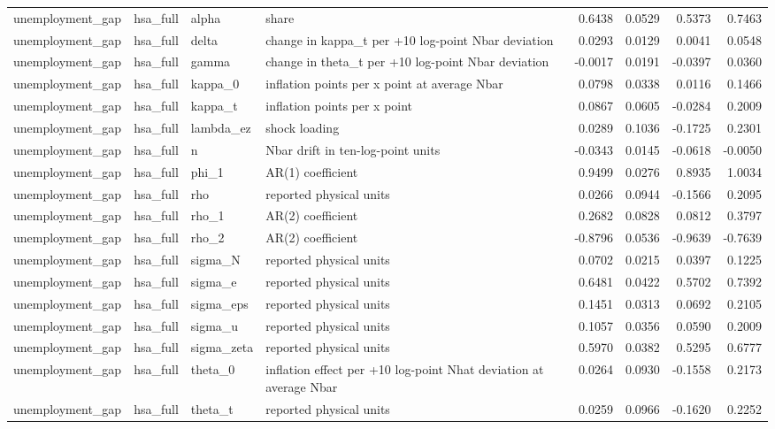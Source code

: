 \begin{tabular}{llllrrrr}
unemployment\_gap & hsa\_full & alpha & share & 0.6438 & 0.0529 & 0.5373 & 0.7463 \\
unemployment\_gap & hsa\_full & delta & change in kappa\_t per +10 log-point Nbar deviation & 0.0293 & 0.0129 & 0.0041 & 0.0548 \\
unemployment\_gap & hsa\_full & gamma & change in theta\_t per +10 log-point Nbar deviation & -0.0017 & 0.0191 & -0.0397 & 0.0360 \\
unemployment\_gap & hsa\_full & kappa\_0 & inflation points per x point at average Nbar & 0.0798 & 0.0338 & 0.0116 & 0.1466 \\
unemployment\_gap & hsa\_full & kappa\_t & inflation points per x point & 0.0867 & 0.0605 & -0.0284 & 0.2009 \\
unemployment\_gap & hsa\_full & lambda\_ez & shock loading & 0.0289 & 0.1036 & -0.1725 & 0.2301 \\
unemployment\_gap & hsa\_full & n & Nbar drift in ten-log-point units & -0.0343 & 0.0145 & -0.0618 & -0.0050 \\
unemployment\_gap & hsa\_full & phi\_1 & AR(1) coefficient & 0.9499 & 0.0276 & 0.8935 & 1.0034 \\
unemployment\_gap & hsa\_full & rho & reported physical units & 0.0266 & 0.0944 & -0.1566 & 0.2095 \\
unemployment\_gap & hsa\_full & rho\_1 & AR(2) coefficient & 0.2682 & 0.0828 & 0.0812 & 0.3797 \\
unemployment\_gap & hsa\_full & rho\_2 & AR(2) coefficient & -0.8796 & 0.0536 & -0.9639 & -0.7639 \\
unemployment\_gap & hsa\_full & sigma\_N & reported physical units & 0.0702 & 0.0215 & 0.0397 & 0.1225 \\
unemployment\_gap & hsa\_full & sigma\_e & reported physical units & 0.6481 & 0.0422 & 0.5702 & 0.7392 \\
unemployment\_gap & hsa\_full & sigma\_eps & reported physical units & 0.1451 & 0.0313 & 0.0692 & 0.2105 \\
unemployment\_gap & hsa\_full & sigma\_u & reported physical units & 0.1057 & 0.0356 & 0.0590 & 0.2009 \\
unemployment\_gap & hsa\_full & sigma\_zeta & reported physical units & 0.5970 & 0.0382 & 0.5295 & 0.6777 \\
unemployment\_gap & hsa\_full & theta\_0 & inflation effect per +10 log-point Nhat deviation at average Nbar & 0.0264 & 0.0930 & -0.1558 & 0.2173 \\
unemployment\_gap & hsa\_full & theta\_t & reported physical units & 0.0259 & 0.0966 & -0.1620 & 0.2252 \\

\end{tabular}
